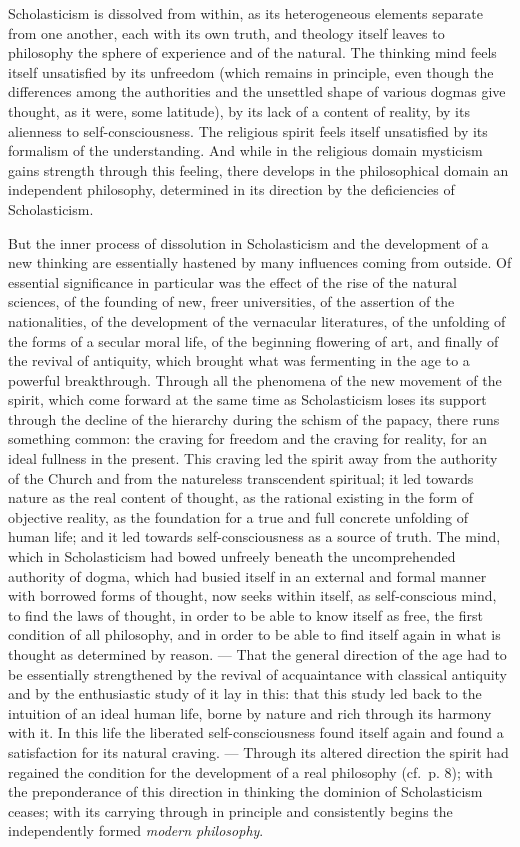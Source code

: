 Scholasticism is dissolved from within, as its heterogeneous elements separate from one another, each with its own truth, and theology itself leaves to philosophy the sphere of experience and of the natural. The thinking mind feels itself unsatisfied by its unfreedom (which remains in principle, even though the differences among the authorities and the unsettled shape of various dogmas give thought, as it were, some latitude), by its lack of a content of reality, by its alienness to self-consciousness. The religious spirit feels itself unsatisfied by its formalism of the understanding. And while in the religious domain mysticism gains strength through this feeling, there develops in the philosophical domain an independent philosophy, determined in its direction by the deficiencies of Scholasticism.

But the inner process of dissolution in Scholasticism and the development of a new thinking are essentially hastened by many influences coming from outside. Of essential significance in particular was the effect of the rise of the natural sciences, of the founding of new, freer universities, of the assertion of the nationalities, of the development of the vernacular literatures, of the unfolding of the forms of a secular moral life, of the beginning flowering of art, and finally of the revival of antiquity, which brought what was fermenting in the age to a powerful breakthrough. Through all the phenomena of the new movement of the spirit, which come forward at the same time as Scholasticism loses its support through the decline of the hierarchy during the schism of the papacy, there runs something common: the craving for freedom and the craving for reality, for an ideal fullness in the present. This craving led the spirit away from the authority of the Church and from the natureless transcendent spiritual; it led towards nature as the real content of thought, as the rational existing in the form of objective reality, as the foundation for a true and full concrete unfolding of human life; and it led towards self-consciousness as a source of truth. The mind, which in Scholasticism had bowed unfreely beneath the uncomprehended authority of dogma, which had busied itself in an external and formal manner with borrowed forms of thought, now seeks within itself, as self-conscious mind, to find the laws of thought, in order to be able to know itself as free, the first condition of all philosophy, and in order to be able to find itself again in what is thought as determined by reason. --- That the general direction of the age had to be essentially strengthened by the revival of acquaintance with classical antiquity and by the enthusiastic study of it lay in this: that this study led back to the intuition of an ideal human life, borne by nature and rich through its harmony with it. In this life the liberated self-consciousness found itself again and found a satisfaction for its natural craving. --- Through its altered direction the spirit had regained the condition for the development of a real philosophy (cf.\ p. 8); with the preponderance of this direction in thinking the dominion of Scholasticism ceases; with its carrying through in principle and consistently begins the independently formed \emph{modern philosophy}.

